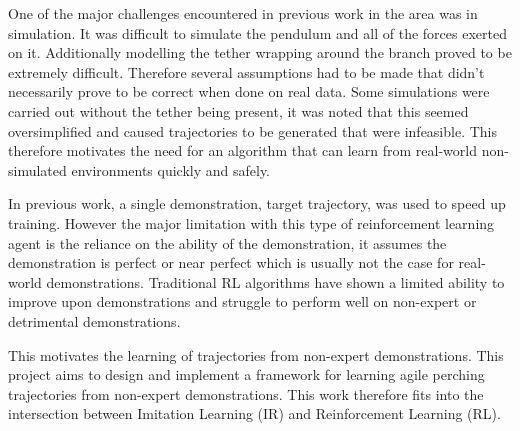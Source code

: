 One of the major challenges encountered in previous work in the area was in simulation.
It was difficult to simulate the pendulum and all of the forces exerted on it.
Additionally modelling the tether wrapping around the branch proved to be extremely difficult.
Therefore several assumptions had to be made that didn't necessarily prove to be correct when done on real data.
Some simulations were carried out without the tether being present, it was noted that this seemed oversimplified and caused trajectories to be generated that were infeasible.
This therefore motivates the need for an algorithm that can learn from real-world non-simulated environments quickly and safely.

In previous work, a single demonstration, target trajectory, was used to speed up training.
However the major limitation with this type of reinforcement learning agent is the reliance on the ability of the demonstration, it assumes the demonstration is perfect or near perfect which is usually not the case for real-world demonstrations.
Traditional RL algorithms have shown a limited ability to improve upon demonstrations and struggle to perform well on non-expert or detrimental demonstrations.

This motivates the learning of trajectories from non-expert demonstrations.
This project aims to design and implement a framework for learning agile perching trajectories from non-expert demonstrations.
This work therefore fits into the intersection between Imitation Learning (IR) and Reinforcement Learning (RL).